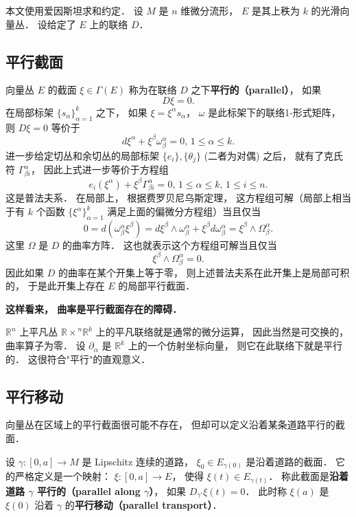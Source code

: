 

本文使用爱因斯坦求和约定． 设 $M$ 是 $n$ 维微分流形， $E$ 是其上秩为 $k$ 的光滑向量丛． 设给定了 $E$ 上的联络 $D$．

\subsection{平行截面}

向量丛 $E$ 的截面 $\xi\in\Gamma(E)$ 称为在联络 $D$ 之下\textbf{平行的（parallel）}， 如果
$$D\xi=0.$$
在局部标架 $\{s_\alpha\}_{\alpha=1}^k$ 之下， 如果 $\xi=\xi^\alpha s_\alpha$， $\omega$ 是此标架下的联络1-形式矩阵， 则 $D\xi=0$ 等价于
$$
d\xi^\alpha+\xi^\beta\omega^\alpha_\beta=0,\,1\leq \alpha\leq k.
$$
进一步给定切丛和余切丛的局部标架 $\{e_i\},\{\theta_j\}$ (二者为对偶) 之后， 就有了克氏符 $\Gamma_{\beta i}^\alpha$， 因此上式进一步等价于方程组
$$
e_i(\xi^\alpha)+\xi^\beta\Gamma^\alpha_{\beta i}=0,\,1\leq \alpha\leq k,\,1\leq i\leq n.
$$
这是普法夫系． 在局部上， 根据费罗贝尼乌斯定理， 这方程组可解（局部上相当于有 $k$ 个函数 $\{\xi^\alpha\}_{\alpha=1}^k$ 满足上面的偏微分方程组）当且仅当
$$
0=d(\omega^\alpha_\beta\xi^\beta)=d\xi^\beta\wedge\omega^\alpha_\beta+\xi^\beta d\omega^\alpha_\beta=\xi^\beta\wedge\Omega_\beta^\alpha.
$$
这里 $\Omega$ 是 $D$ 的曲率方阵． 这也就表示这个方程组可解当且仅当
$$
\xi^\beta\wedge\Omega_\beta^\alpha=0.
$$
因此如果 $D$ 的曲率在某个开集上等于零， 则上述普法夫系在此开集上是局部可积的， 于是此开集上存在 $E$ 的局部平行截面．

\textbf{这样看来， 曲率是平行截面存在的障碍．}

$\mathbb{R}^n$ 上平凡丛 $\mathbb{R\times}^n\mathbb{R}^k$ 上的平凡联络就是通常的微分运算， 因此当然是可交换的， 曲率算子为零． 设 $\partial_\alpha$ 是 $\mathbb{R}^k$ 上的一个仿射坐标向量， 则它在此联络下就是平行的． 这很符合"平行"的直观意义． 

\subsection{平行移动}
向量丛在区域上的平行截面很可能不存在， 但却可以定义沿着某条道路平行的截面． 

设 $\gamma:[0,a]\to M$ 是 Lipschitz 连续的道路， $\xi_0\in E_{\gamma(0)}$ 是沿着道路的截面． 它的严格定义是一个映射： $\xi:[0,a]\to E$， 使得 $\xi(t)\in E_{\gamma(t)}$． 称此截面是\textbf{沿着道路 $\gamma$ 平行的（parallel along $\gamma$）}， 如果 $D_{\gamma'}\xi(t)=0$． 此时称 $\xi(a)$ 是 $\xi(0)$ 沿着 $\gamma$ 的\textbf{平行移动（parallel transport）}．


